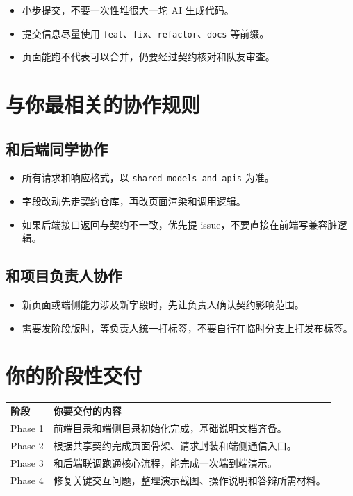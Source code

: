 \documentclass[11pt,a4paper]{ctexart}
\begin{document}
\begin{itemize}
  \item 小步提交，不要一次性堆很大一坨 AI 生成代码。
  \item 提交信息尽量使用 \texttt{feat}、\texttt{fix}、\texttt{refactor}、\texttt{docs} 等前缀。
  \item 页面能跑不代表可以合并，仍要经过契约核对和队友审查。
\end{itemize}

\section{与你最相关的协作规则}

\subsection{和后端同学协作}

\begin{itemize}
  \item 所有请求和响应格式，以 \texttt{shared-models-and-apis} 为准。
  \item 字段改动先走契约仓库，再改页面渲染和调用逻辑。
  \item 如果后端接口返回与契约不一致，优先提 issue，不要直接在前端写兼容脏逻辑。
\end{itemize}

\subsection{和项目负责人协作}

\begin{itemize}
  \item 新页面或端侧能力涉及新字段时，先让负责人确认契约影响范围。
  \item 需要发阶段版时，等负责人统一打标签，不要自行在临时分支上打发布标签。
\end{itemize}

\section{你的阶段性交付}

\begin{longtable}{>{\raggedright\arraybackslash}p{} >{\raggedright\arraybackslash}p{}}
\textbf{阶段} & \textbf{你要交付的内容} \\
Phase 1 & 前端目录和端侧目录初始化完成，基础说明文档齐备。 \\
Phase 2 & 根据共享契约完成页面骨架、请求封装和端侧通信入口。 \\
Phase 3 & 和后端联调跑通核心流程，能完成一次端到端演示。 \\
Phase 4 & 修复关键交互问题，整理演示截图、操作说明和答辩所需材料。 \\
\end{longtable}
\end{document}
